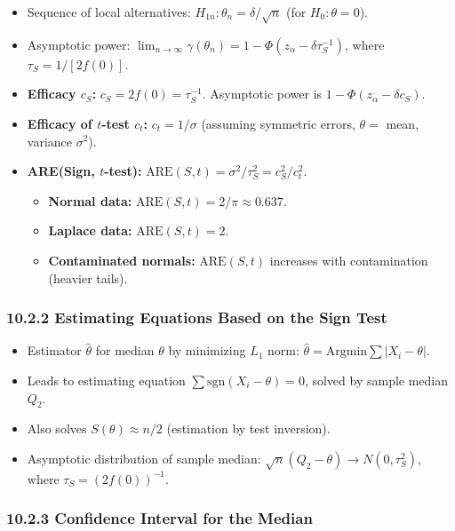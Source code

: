 \begin{itemize}
	\item Sequence of local alternatives: $H_{1n}: \theta_n = \delta/\sqrt{n}$ (for $H_0: \theta=0$).
	\item Asymptotic power: $\lim_{n \to \infty} \gamma(\theta_n) = 1 - \Phi(z_\alpha - \delta \tau_S^{-1})$, where $\tau_S = 1/[2f(0)]$.
	\item \textbf{Efficacy $c_S$:} $c_S = 2f(0) = \tau_S^{-1}$. Asymptotic power is $1 - \Phi(z_\alpha - \delta c_S)$.
	\item \textbf{Efficacy of $t$-test $c_t$:} $c_t = 1/\sigma$ (assuming symmetric errors, $\theta=$ mean, variance $\sigma^2$).
	\item \textbf{ARE(Sign, $t$-test):} $\text{ARE}(S, t) = \sigma^2/\tau_S^2 = c_S^2/c_t^2$.
	\begin{itemize}
		\item \textbf{Normal data:} $\text{ARE}(S,t) = 2/\pi \approx 0.637$.
		\item \textbf{Laplace data:} $\text{ARE}(S,t) = 2$.
		\item \textbf{Contaminated normals:} $\text{ARE}(S,t)$ increases with contamination (heavier tails).
	\end{itemize}
\end{itemize}

\subsubsection{10.2.2 Estimating Equations Based on the Sign Test}

\begin{itemize}
	\item Estimator $\widehat{\theta}$ for median $\theta$ by minimizing $L_1$ norm: $\widehat{\theta} = \text{Argmin} \sum |X_i - \theta|$.
	\item Leads to estimating equation $\sum \text{sgn}(X_i - \theta) = 0$, solved by sample median $Q_2$.
	\item Also solves $S(\theta) \approx n/2$ (estimation by test inversion).
	\item Asymptotic distribution of sample median: $\sqrt{n}(Q_2 - \theta) \to N(0, \tau_S^2)$, where $\tau_S = (2f(0))^{-1}$.
\end{itemize}

\subsubsection{10.2.3 Confidence Interval for the Median}

